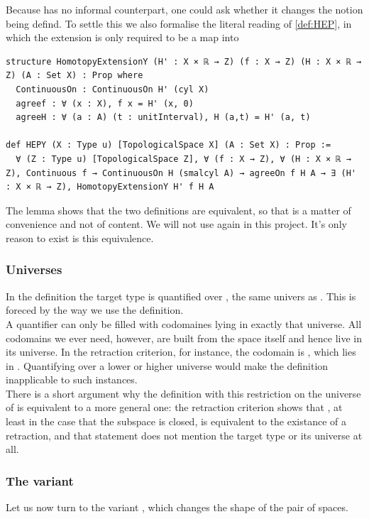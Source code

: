 \documentclass[11pt, a4paper, english]{article}
\theoremstyle{plain}
\theoremstyle{definition}
\theoremstyle{remark}
\numberwithin{equation}{section}
\numberwithin{theorem}{section}
\begin{document}
Because  has no informal counterpart, one could ask whether it changes the notion being defind. To settle this we also formalise the literal reading of \cref{def:HEP}, in which the extension is only required to be a map into 
\begin{verbatim}
structure HomotopyExtensionY (H' : X × ℝ → Z) (f : X → Z) (H : X × ℝ → Z) (A : Set X) : Prop where
  ContinuousOn : ContinuousOn H' (cyl X)
  agreef : ∀ (x : X), f x = H' (x, 0)
  agreeH : ∀ (a : A) (t : unitInterval), H (a,t) = H' (a, t)

def HEPY (X : Type u) [TopologicalSpace X] (A : Set X) : Prop :=
  ∀ (Z : Type u) [TopologicalSpace Z], ∀ (f : X → Z), ∀ (H : X × ℝ → Z), Continuous f → ContinuousOn H (smalcyl A) → agreeOn f H A → ∃ (H' : X × ℝ → Z), HomotopyExtensionY H' f H A
\end{verbatim}

The lemma  shows that the two definitions are equivalent, so that  is a matter of convenience and not of content. We will not use  again in this project. It's only reason to exist is this equivalence. 

\subsubsection*{Universes}

In the definition the target type  is quantified over , the same univers as .  This is foreced by the way we use the definition.\\
A quantifier  can only be filled with codomaines lying in exactly that universe. All codomains we ever need, however, are built from the space  itself and hence live in its universe. In the retraction criterion, for instance, the codomain is , which lies in . Quantifying over a lower or higher universe would make the definition inapplicable to such instances. \\
There is a short argument why the definition with this restriction on the universe of  is equivalent to a more general one: the retraction criterion shows that , at least in the case that the subspace is closed, is equivalent to the existance of a retraction, and that statement does not mention the target type  or its universe at all. 

\subsubsection*{The variant }
Let us now turn to the variant , which changes the shape of the pair of spaces.
\end{document}
